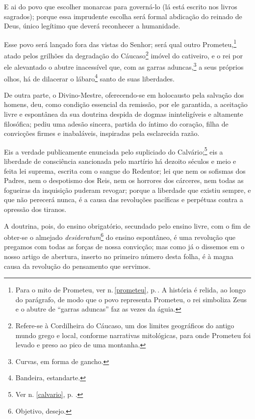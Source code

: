 E ai do povo que escolher monarcas para governá-lo (lá está escrito nos
livros sagrados); porque essa imprudente escolha será formal abdicação
do reinado de Deus, único legítimo que deverá reconhecer a humanidade.

Esse povo será lançado fora das vistas do Senhor; será qual outro
Prometeu,\footnote{Para o mito de Prometeu, ver n.\,\ref{prometeu}, p.\,\pageref{prometeu}. A história é relida, ao longo do parágrafo, de modo que o povo
  representa Prometeu, o rei simboliza Zeus e o abutre de ``garras
  aduncas'' faz as vezes da águia.} atado pelos grilhões da degradação
do Cáucaso\footnote{Refere-se à Cordilheira do Cáucaso, um dos limites
  geográficos do antigo mundo grego e local, conforme narrativas
  mitológicas, para onde Prometeu foi levado e preso ao pico de uma
  montanha.} imóvel do cativeiro, e o rei por ele alevantado o abutre
inacessível que, com as garras aduncas,\footnote{Curvas, em forma de
  gancho.} a seus próprios olhos, há de dilacerar o lábaro\footnote{
  Bandeira, estandarte.} santo de suas liberdades.

De outra parte, o Divino-Mestre, oferecendo-se em holocausto pela
salvação dos homens, deu, como condição essencial da remissão, por ele
garantida, a aceitação livre e espontânea da sua doutrina despida de
dogmas ininteligíveis e altamente filosófica; pediu uma adesão sincera,
partida do íntimo do coração, filha de convicções firmes e inabaláveis,
inspiradas pela esclarecida razão.

Eis a verdade publicamente enunciada pelo supliciado do
Calvário;\footnote{Ver n. \ref{calvario}, p. \pageref{calvario}.} eis a 
liberdade de consciência sancionada pelo martírio
há dezoito séculos e meio e feita lei suprema, escrita com o sangue do
Redentor; lei que nem os sofismas dos Padres, nem o despotismo dos Reis,
nem os horrores dos cárceres, nem todas as fogueiras da inquisição
puderam revogar; porque a liberdade que existiu sempre, e que não
perecerá nunca, é a causa das revoluções pacíficas e perpétuas contra a
opressão dos tiranos.

A doutrina, pois, do ensino obrigatório, secundado pelo ensino livre,
com o fim de obter-se o almejado \textit{desideratum}\footnote{Objetivo,
  desejo.} do ensino espontâneo, é uma revolução que pregamos com todas
as forças de nossa convicção; mas como já o dissemos em o nosso artigo
de abertura, inserto no primeiro número desta folha, é à magna causa da
revolução do pensamento que servimos.

